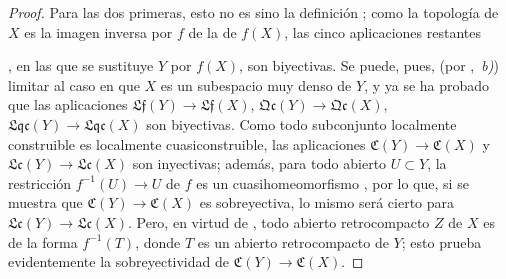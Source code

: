 \begin{proof}

Para las dos primeras, esto no es sino la definición ; como la topología de $X$ es la imagen inversa por $f$ de la de $f(X)$, las cinco aplicaciones restantes


, en las que se sustituye $Y$ por $f(X)$, son biyectivas.
Se puede, pues, (por ,~\emph{b)}) limitar al caso en que $X$ es un subespacio muy denso de $Y$, y ya se ha probado  que las aplicaciones $\mathfrak{Lf}(Y)\to\mathfrak{Lf}(X)$, $\mathfrak{Qc}(Y)\to\mathfrak{Qc}(X)$, $\mathfrak{Lqc}(Y)\to\mathfrak{Lqc}(X)$ son biyectivas.
Como todo subconjunto localmente construible es localmente cuasiconstruible, las aplicaciones $\mathfrak C(Y)\to\mathfrak C(X)$ y $\mathfrak{Lc}(Y)\to\mathfrak{Lc}(X)$ son inyectivas; además, para todo abierto $U\subset Y$, la restricción $f^{-1}(U)\to U$ de $f$ es un cuasihomeomorfismo , por lo que, si se muestra que $\mathfrak C(Y)\to\mathfrak C(X)$ es sobreyectiva, lo mismo será cierto para $\mathfrak{Lc}(Y)\to\mathfrak{Lc}(X)$.
Pero, en virtud de , todo abierto retrocompacto $Z$ de $X$ es de la forma $f^{-1}(T)$, donde $T$ es un abierto retrocompacto de $Y$; esto prueba evidentemente la sobreyectividad de $\mathfrak C(Y)\to\mathfrak C(X)$.
\end{proof}

